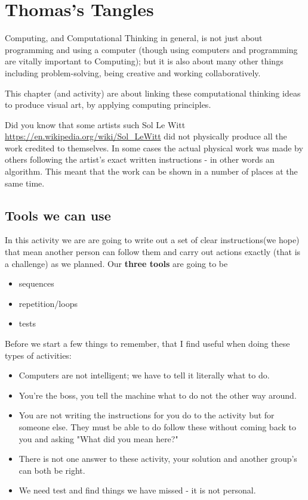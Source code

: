 \chapter{Thomas's Tangles}


Computing, and Computational Thinking in general,  is not just about programming and using a computer (though using computers and  programming are vitally important to Computing); but it is also about many other things including problem-solving, being creative and working collaboratively.

This chapter (and activity) are about linking these computational thinking ideas to produce visual art, by applying computing principles. 

Did you know that some artists such Sol Le Witt \url{https://en.wikipedia.org/wiki/Sol_LeWitt} did not physically produce all the work credited to themselves. In some cases the actual physical work was made by others following the artist's exact written instructions - in other words an algorithm. This meant that the work can be shown in a number of places at the same time.

\section{Tools we can use}

In this activity we are are going to write out a set of clear instructions(we hope) that mean another person can follow them and carry out actions exactly (that is a challenge) as we planned. Our \textbf{three tools} are going to be 
\begin{itemize}
    \item sequences
    \item repetition/loops
    \item tests
\end{itemize}


Before we start a few things to remember, that I find useful when doing these types of activities:
\begin{itemize}
    \item Computers are not intelligent; we have to tell it literally what to do.
    \item You're the boss, you tell the machine what to do not the other way around.
    \item You are not writing the instructions for you do to the activity but for someone else. They must be able to do follow these without coming back to you and asking "What did you mean here?"
    \item There is not one answer to these activity, your solution and another group's can both be right.  
    \item We need test and find things we have missed - it is not personal.
\end{itemize}

